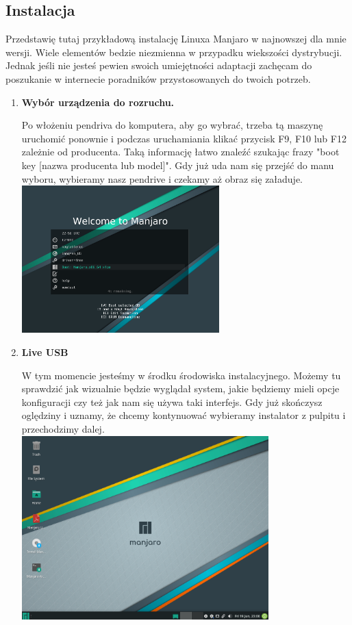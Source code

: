 \documentclass[10pt,a4paper]{article}
\begin{document}
		\subsection{Instalacja}
		
Przedstawię tutaj przykładową instalację Linuxa Manjaro w najnowszej dla mnie wersji. Wiele elementów bedzie niezmienna w przypadku wiekszości dystrybucji. Jednak jeśli nie jesteś pewien swoich umiejętności adaptacji zachęcam do poszukanie w internecie poradników przystosowanych do twoich potrzeb.

\begin{enumerate}
\item \textbf{Wybór urządzenia do rozruchu.}\par
Po włożeniu pendriva do komputera, aby go wybrać, trzeba tą maszynę uruchomić ponownie i podczas uruchamiania klikać przycisk F9, F10 lub F12 zależnie od producenta. Taką informację łatwo znaleźć szukając frazy "boot key [nazwa producenta lub model]". Gdy już uda nam się przejść do manu wyboru, wybieramy nasz pendrive i czekamy aż obraz się załaduje.\\

\includegraphics[width=0.6\textwidth, center]{manjaro_install1.png}

\item \textbf{Live USB} \par
W tym momencie jesteśmy w środku środowiska instalacyjnego. Możemy tu sprawdzić jak wizualnie będzie wyglądał system, jakie będziemy mieli opcje konfiguracji czy też jak nam się używa taki interfejs. Gdy już skończysz oględziny i uznamy, że chcemy kontynuować wybieramy instalator z pulpitu i przechodzimy dalej.\\

\includegraphics[width=0.75\textwidth, center]{manjaro_install2.png}




\end{enumerate}
\end{document}
